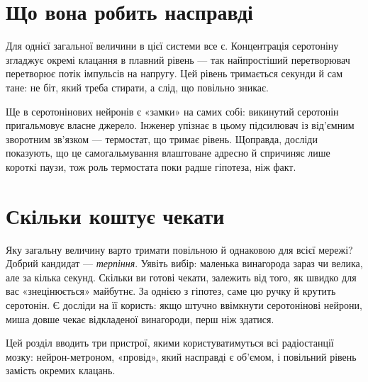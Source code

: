 
\section*{Що вона робить насправді}

Для однієї загальної величини в цієї системи все є. Концентрація серотоніну згладжує окремі клацання в плавний рівень --- так найпростіший перетворювач перетворює потік імпульсів на напругу. Цей рівень тримається секунди й сам тане: не біт, який треба стирати, а слід, що повільно зникає.

Ще в серотонінових нейронів є «замки» на самих собі: викинутий серотонін пригальмовує власне джерело. Інженер упізнає в цьому підсилювач із від'ємним зворотним зв'язком --- термостат, що тримає рівень. Щоправда, досліди показують, що це самогальмування влаштоване адресно й спричиняє лише короткі паузи, тож роль термостата поки радше гіпотеза, ніж факт.

\section*{Скільки коштує чекати}

Яку загальну величину варто тримати повільною й однаковою для всієї мережі? Добрий кандидат --- \emph{терпіння}. Уявіть вибір: маленька винагорода зараз чи велика, але за кілька секунд. Скільки ви готові чекати, залежить від того, як швидко для вас «знецінюється» майбутнє. За однією з гіпотез, саме цю ручку й крутить серотонін. Є досліди на її користь: якщо штучно ввімкнути серотонінові нейрони, миша довше чекає відкладеної винагороди, перш ніж здатися.

Цей розділ вводить три пристрої, якими користуватимуться всі радіостанції мозку: нейрон-метроном, «провід», який насправді є об'ємом, і повільний рівень замість окремих клацань.

